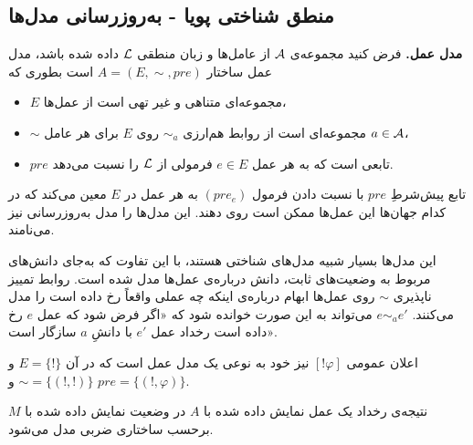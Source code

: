 \subsection{منطق شناختی پویا - به‌روزرسانی مدل‌ها \texorpdfstring{ }{(DEL)}}
\begin{definition}{\textbf{مدل عمل.}}
فرض کنید مجموعه‌ی $ \mathcal{A} $ از عامل‌ها و زبان منطقی $ \mathcal{L} $ داده شده باشد، مدل عمل ساختار $ A=(E,\sim,pre) $ است بطوری که
\begin{itemize}
\item
$ E $ مجموعه‌ای متناهی و غیر تهی است از عمل‌ها،
\item
$ \sim $ مجموعه‌ای است از روابط هم‌ارزی $ \sim_a $ روی $ E $ برای هر عامل $ a\in\mathcal{A} $،
\item
$ pre $ تابعی است که به هر عمل $ e\in E $ فرمولی از $ \mathcal{L} $ را نسبت می‌دهد.
\end{itemize}
تابع پیش‌شرطِ $ pre $ با نسبت دادن فرمول $ (pre_e) $ به هر عمل در $ E $ معین می‌کند که در کدام جهان‌ها این عمل‌ها ممکن است روی دهند. این مدل‌ها را مدل به‌روزرسانی نیز می‌نامند.
\end{definition}
این مدل‌ها بسیار شبیه مدل‌های شناختی هستند، با این تفاوت که به‌جای دانش‌های مربوط به وضعیت‌های ثابت، دانش درباره‌ی عمل‌ها مدل شده است. روابط تمییز ناپذیری $ \sim $ روی عمل‌ها ابهام درباره‌ی اینکه چه عملی واقعاً رخ داده است را مدل می‌کنند. $ e\sim_a e' $ می‌تواند به این صورت خوانده شود که «اگر فرض شود که عمل $ e $ رخ داده است رخداد عمل $ e' $ با دانشِ $ a $ سازگار است». 

اعلان عمومی $ [!\varphi] $ نیز خود به نوعی یک مدل عمل است که در آن $ E=\{!\} $ و  $ \sim=\{(!,!)\}  $ و $ pre=\{(!,\varphi)\} $.

نتیجه‌ی رخداد یک عمل نمایش داده شده با $ A $ در وضعیت نمایش داده شده با $ M $ برحسب ساختاری ضربی مدل می‌شود.
